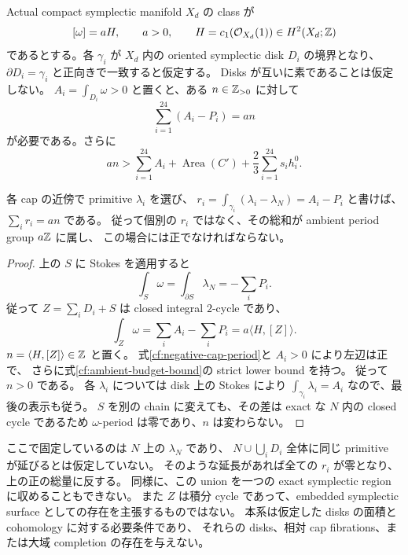 \begin{corollary}
\label{cf:ambient-period-budget}
Actual compact symplectic manifold $X_d$ の class が
\[
 [\omega]=aH,\qquad a>0,\qquad H=c_1(\mathcal O_{X_d}(1))\in H^2(X_d;\mathbb Z)
\]
であるとする。各 $\gamma_i$ が $X_d$ 内の oriented symplectic disk $D_i$ の境界となり、
$\partial D_i=\gamma_i$ と正向きで一致すると仮定する。
Disks が互いに素であることは仮定しない。
$A_i=\int_{D_i}\omega>0$ と置くと、ある $n\in\mathbb Z_{>0}$ に対して
\begin{equation}\label{cf:ambient-budget}
 \sum_{i=1}^{24}(A_i-P_i)=a n
\end{equation}
が必要である。さらに
\begin{equation}\label{cf:ambient-budget-bound}
 a n>
 \sum_{i=1}^{24}A_i+\operatorname{Area}(C')
       +\frac23\sum_{i=1}^{24}s_i h_i^0.
\end{equation}

各 cap の近傍で primitive $\lambda_i$ を選び、
$r_i=\int_{\gamma_i}(\lambda_i-\lambda_N)=A_i-P_i$ と書けば、
$\sum_i r_i=a n$ である。
従って個別の $r_i$ ではなく、その総和が ambient period group $a\mathbb Z$ に属し、
この場合には正でなければならない。
\end{corollary}

\begin{proof}
上の $S$ に Stokes を適用すると
\[
 \int_S\omega=\int_{\partial S}\lambda_N=-\sum_iP_i.
\]
従って $Z=\sum_iD_i+S$ は closed integral $2$-cycle であり、
\[
 \int_Z\omega=\sum_i A_i-\sum_iP_i
       =a\langle H,[Z]\rangle.
\]
$n=\langle H,[Z]\rangle\in\mathbb Z$ と置く。
式\eqref{cf:negative-cap-period}と $A_i>0$ により左辺は正で、
さらに式\eqref{cf:ambient-budget-bound}の strict lower bound を持つ。
従って $n>0$ である。
各 $\lambda_i$ については disk 上の Stokes により
$\int_{\gamma_i}\lambda_i=A_i$ なので、最後の表示も従う。
$S$ を別の chain に変えても、その差は exact な $N$ 内の closed cycle であるため
$\omega$-period は零であり、$n$ は変わらない。
\end{proof}

ここで固定しているのは $N$ 上の $\lambda_N$ であり、
$N\cup\bigcup_iD_i$ 全体に同じ primitive が延びるとは仮定していない。
そのような延長があれば全ての $r_i$ が零となり、上の正の総量に反する。
同様に、この union を一つの exact symplectic region に収めることもできない。
また $Z$ は積分 cycle であって、embedded symplectic surface としての存在を主張するものではない。
本系は仮定した disks の面積と cohomology に対する必要条件であり、
それらの disks、相対 cap fibrations、または大域 completion の存在を与えない。

